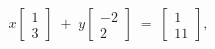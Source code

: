 \documentclass[preview]{standalone}
\begin{document}
\begin{align*}
x \begin{bmatrix} 1 \\ 3 \end{bmatrix} \;+\;y \begin{bmatrix} -2 \\ 2 \end{bmatrix} \;=\;\begin{bmatrix} 1 \\ 11 \end{bmatrix},
\end{align*}
\end{document}
